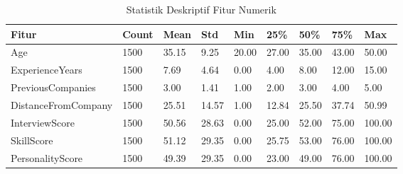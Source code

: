 \begin{table}[H]
    \centering
    \caption{Statistik Deskriptif Fitur Numerik}
    \label{tb:statistik-deskriptif}
    \begin{tabular}{|l|l|l|l|l|l|l|l|l|}
    \hline
    \rowcolor[HTML]{EFEFEF} 
    Fitur               & Count & Mean  & Std   & Min   & 25\%  & 50\%  & 75\%  & Max   \\ \hline
    Age                 & 1500  & 35.15 & 9.25  & 20.00 & 27.00 & 35.00 & 43.00 & 50.00 \\ \hline
    ExperienceYears     & 1500  & 7.69  & 4.64  & 0.00  & 4.00  & 8.00  & 12.00 & 15.00 \\ \hline
    PreviousCompanies   & 1500  & 3.00  & 1.41  & 1.00  & 2.00  & 3.00  & 4.00  & 5.00  \\ \hline
    DistanceFromCompany & 1500  & 25.51 & 14.57 & 1.00  & 12.84 & 25.50 & 37.74 & 50.99 \\ \hline
    InterviewScore      & 1500  & 50.56 & 28.63 & 0.00  & 25.00 & 52.00 & 75.00 & 100.00\\ \hline
    SkillScore          & 1500  & 51.12 & 29.35 & 0.00  & 25.75 & 53.00 & 76.00 & 100.00\\ \hline
    PersonalityScore    & 1500  & 49.39 & 29.35 & 0.00   &23.00&49.00&76.00&100.00\\ \hline
    \end{tabular}
\end{table}

    


